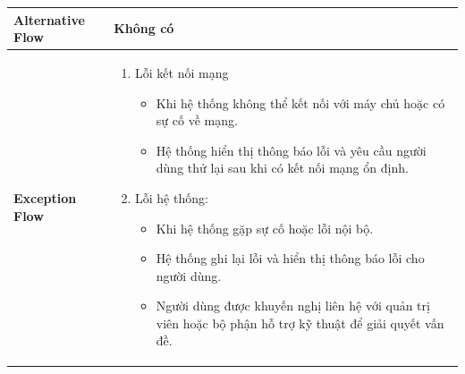 \begin{longtable}[H]{|l|p{}|}
    \hline
        \textbf{Alternative Flow} & Không có \\
    \hline 
        \textbf{Exception Flow} & \vspace{-0.75cm} \begin{enumerate}[leftmargin=5.5mm]
            \item Lỗi kết nối mạng
                \begin{itemize}[topsep=0pt]
                    \setlength\itemsep{0em}
                    \item Khi hệ thống không thể kết nối với máy chủ hoặc có sự cố về mạng.
                    \item Hệ thống hiển thị thông báo lỗi và yêu cầu người dùng thử lại sau khi có kết nối mạng ổn định.
                \end{itemize}
            \item Lỗi hệ thống:
                \begin{itemize}[topsep=0pt]
                    \setlength\itemsep{0em}
                    \item Khi hệ thống gặp sự cố hoặc lỗi nội bộ.
                    \item Hệ thống ghi lại lỗi và hiển thị thông báo lỗi cho người dùng.
                    \item Người dùng được khuyến nghị liên hệ với quản trị viên hoặc bộ phận hỗ trợ kỹ thuật để giải quyết vấn đề.
                \end{itemize}
        \end{enumerate}\\
    \hline 
    \end{longtable}

